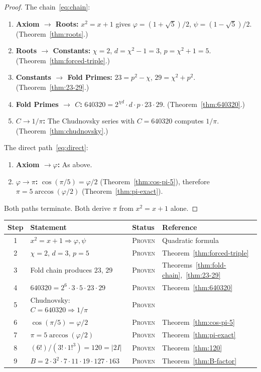 \documentclass[11pt,a4paper]{article}
\theoremstyle{plain}
\theoremstyle{definition}
\begin{document}
\begin{proof}
The chain~\eqref{eq:chain}:
\begin{enumerate}[nosep]
  \item \textbf{Axiom $\to$ Roots:} $x^2 = x + 1$ gives
    $\varphi = (1+\sqrt{5})/2$, $\psi = (1-\sqrt{5})/2$.
    (Theorem~\ref{thm:roots}.)
  \item \textbf{Roots $\to$ Constants:} $\chi = 2$, $d = \chi^2 - 1 = 3$,
    $p = \chi^2 + 1 = 5$. (Theorem~\ref{thm:forced-triple}.)
  \item \textbf{Constants $\to$ Fold Primes:} $23 = p^2 - \chi$,
    $29 = \chi^2 + p^2$. (Theorem~\ref{thm:23-29}.)
  \item \textbf{Fold Primes $\to$ $C$:}
    $640320 = 2^{\chi d} \cdot d \cdot p \cdot 23 \cdot 29$.
    (Theorem~\ref{thm:640320}.)
  \item \textbf{$C \to 1/\pi$:} The Chudnovsky series with $C = 640320$
    computes $1/\pi$. (Theorem~\ref{thm:chudnovsky}.)
\end{enumerate}

The direct path~\eqref{eq:direct}:
\begin{enumerate}[nosep]
  \item \textbf{Axiom $\to \varphi$:} As above.
  \item \textbf{$\varphi \to \pi$:}
    $\cos(\pi/5) = \varphi/2$ (Theorem~\ref{thm:cos-pi-5}),
    therefore $\pi = 5\arccos(\varphi/2)$ (Theorem~\ref{thm:pi-exact}).
\end{enumerate}

Both paths terminate. Both derive $\pi$ from $x^2 = x + 1$ alone.
\end{proof}

\begin{center}
\begin{tabular}{@{}clll@{}}
\toprule
Step & Statement & Status & Reference \\
\midrule
1 & $x^2 = x + 1 \Rightarrow \varphi, \psi$ &
  \textsc{Proven} & Quadratic formula \\
2 & $\chi = 2$, $d = 3$, $p = 5$ &
  \textsc{Proven} & Theorem~\ref{thm:forced-triple} \\
3 & Fold chain produces $23$, $29$ &
  \textsc{Proven} & Theorems~\ref{thm:fold-chain},~\ref{thm:23-29} \\
4 & $640320 = 2^6 \cdot 3 \cdot 5 \cdot 23 \cdot 29$ &
  \textsc{Proven} & Theorem~\ref{thm:640320} \\
5 & Chudnovsky: $C = 640320 \Rightarrow 1/\pi$ &
  \textsc{Proven} & \cite{chudnovsky1989} \\
6 & $\cos(\pi/5) = \varphi/2$ &
  \textsc{Proven} & Theorem~\ref{thm:cos-pi-5} \\
7 & $\pi = 5\arccos(\varphi/2)$ &
  \textsc{Proven} & Theorem~\ref{thm:pi-exact} \\
8 & $(6!)/(3! \cdot 1!^3) = 120 = |2I|$ &
  \textsc{Proven} & Theorem~\ref{thm:120} \\
9 & $B = 2 \cdot 3^2 \cdot 7 \cdot 11 \cdot 19 \cdot 127 \cdot 163$ &
  \textsc{Proven} & Theorem~\ref{thm:B-factor} \\
\bottomrule
\end{tabular}
\end{center}
\end{document}
